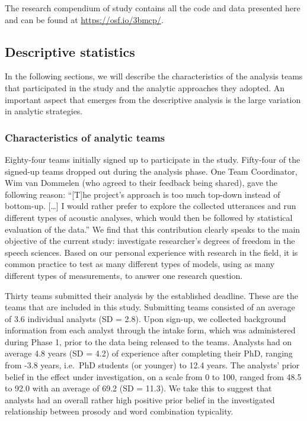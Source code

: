 \documentclass[Review,times,sageh]{sagej}
\begin{document}
The research compendium of study contains all the code and data presented here and can be found at \url{https://osf.io/3bmcp/}.

\hypertarget{descriptive-statistics-1}{%
\subsection{Descriptive statistics}\label{descriptive-statistics-1}}

In the following sections, we will describe the characteristics of the analysis teams that participated in the study and the analytic approaches they adopted.
An important aspect that emerges from the descriptive analysis is the large variation in analytic strategies.

\hypertarget{characteristics-of-analytic-teams}{%
\subsubsection{Characteristics of analytic teams}\label{characteristics-of-analytic-teams}}

Eighty-four teams initially signed up to participate in the study.
Fifty-four of the signed-up teams dropped out during the analysis phase.
One Team Coordinator, Wim van Dommelen (who agreed to their feedback being shared), gave the following reason: ``{[}T{]}he project's approach is too much top-down instead of bottom-up. {[}\ldots{]} I would rather prefer to explore the collected utterances and run different types of acoustic analyses, which would then be followed by statistical evaluation of the data.''
We find that this contribution clearly speaks to the main objective of the current study: investigate researcher's degrees of freedom in the speech sciences.
Based on our personal experience with research in the field, it is common practice to test as many different types of models, using as many different types of measurements, to answer one research question.

Thirty teams submitted their analysis by the established deadline.
These are the teams that are included in this study.
Submitting teams consisted of an average of 3.6 individual analysts (SD = 2.8).
Upon sign-up, we collected background information from each analyst through the intake form, which was administered during Phase 1, prior to the data being released to the teams.
Analysts had on average 4.8 years (SD = 4.2) of experience after completing their PhD, ranging from -3.8 years, i.e.~PhD students (or younger) to 12.4 years.
The analysts' prior belief in the effect under investigation, on a scale from 0 to 100, ranged from 48.5 to 92.0 with an average of 69.2 (SD = 11.3).
We take this to suggest that analysts had an overall rather high positive prior belief in the investigated relationship between prosody and word combination typicality.
\end{document}
